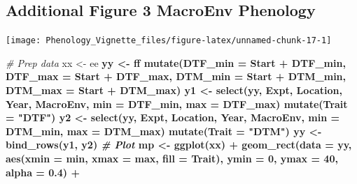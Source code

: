 \documentclass[
]{article}
\newenvironment{Shaded}{\begin{snugshade}}{\end{snugshade}}
\newcommand{\CommentTok}[1]{\textcolor[rgb]{0.56,0.35,0.01}{\textit{#1}}}
\newcommand{\DataTypeTok}[1]{\textcolor[rgb]{0.13,0.29,0.53}{#1}}
\newcommand{\DecValTok}[1]{\textcolor[rgb]{0.00,0.00,0.81}{#1}}
\newcommand{\FloatTok}[1]{\textcolor[rgb]{0.00,0.00,0.81}{#1}}
\newcommand{\KeywordTok}[1]{\textcolor[rgb]{0.13,0.29,0.53}{\textbf{#1}}}
\newcommand{\NormalTok}[1]{#1}
\newcommand{\OperatorTok}[1]{\textcolor[rgb]{0.81,0.36,0.00}{\textbf{#1}}}
\newcommand{\StringTok}[1]{\textcolor[rgb]{0.31,0.60,0.02}{#1}}
\begin{document}
\hypertarget{additional-figure-3-macroenv-phenology}{%
\subsection{Additional Figure 3 MacroEnv
Phenology}\label{additional-figure-3-macroenv-phenology}}

\texttt{[image: Phenology\_Vignette\_files/figure-latex/unnamed-chunk-17-1]}

\begin{Shaded}
\begin{Highlighting}[]
\CommentTok{# Prep data}
\NormalTok{xx <-}\StringTok{ }\NormalTok{ee }\OperatorTok{%
\NormalTok{yy <-}\StringTok{ }\NormalTok{ff }\OperatorTok{%
\StringTok{  }\KeywordTok{mutate}\NormalTok{(}\DataTypeTok{DTF_min =}\NormalTok{ Start }\OperatorTok{+}\StringTok{ }\NormalTok{DTF_min, }\DataTypeTok{DTF_max =}\NormalTok{ Start }\OperatorTok{+}\StringTok{ }\NormalTok{DTF_max,}
         \DataTypeTok{DTM_min =}\NormalTok{ Start }\OperatorTok{+}\StringTok{ }\NormalTok{DTM_min, }\DataTypeTok{DTM_max =}\NormalTok{ Start }\OperatorTok{+}\StringTok{ }\NormalTok{DTM_max)}
\NormalTok{y1 <-}\StringTok{ }\KeywordTok{select}\NormalTok{(yy, Expt, Location, Year, MacroEnv, }\DataTypeTok{min =}\NormalTok{ DTF_min, }\DataTypeTok{max =}\NormalTok{ DTF_max) }\OperatorTok{%
\StringTok{  }\KeywordTok{mutate}\NormalTok{(}\DataTypeTok{Trait =} \StringTok{"DTF"}\NormalTok{)}
\NormalTok{y2 <-}\StringTok{ }\KeywordTok{select}\NormalTok{(yy, Expt, Location, Year, MacroEnv, }\DataTypeTok{min =}\NormalTok{ DTM_min, }\DataTypeTok{max =}\NormalTok{ DTM_max) }\OperatorTok{%
\StringTok{  }\KeywordTok{mutate}\NormalTok{(}\DataTypeTok{Trait =} \StringTok{"DTM"}\NormalTok{)}
\NormalTok{yy <-}\StringTok{ }\KeywordTok{bind_rows}\NormalTok{(y1, y2)}
\CommentTok{# Plot}
\NormalTok{mp <-}\StringTok{ }\KeywordTok{ggplot}\NormalTok{(xx) }\OperatorTok{+}
\StringTok{  }\KeywordTok{geom_rect}\NormalTok{(}\DataTypeTok{data =}\NormalTok{ yy, }\KeywordTok{aes}\NormalTok{(}\DataTypeTok{xmin =}\NormalTok{ min, }\DataTypeTok{xmax =}\NormalTok{ max, }\DataTypeTok{fill =}\NormalTok{ Trait), }
            \DataTypeTok{ymin =} \DecValTok{0}\NormalTok{, }\DataTypeTok{ymax =} \DecValTok{40}\NormalTok{, }\DataTypeTok{alpha =} \FloatTok{0.4}\NormalTok{) }\OperatorTok{+}
}}}}
\end{Highlighting}
\end{Shaded}
\end{document}
